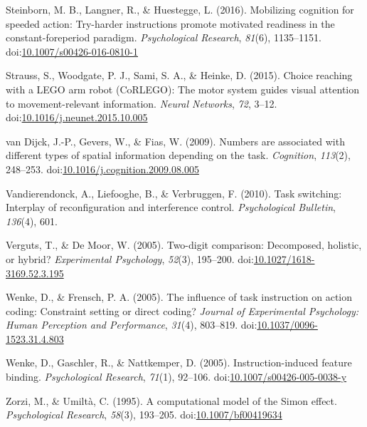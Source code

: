\documentclass[english,man]{apa6}
\theoremstyle{definition}
\theoremstyle{definition}
\theoremstyle{definition}
\theoremstyle{remark}
\begin{document}
\hypertarget{ref-steinborn2016}{}
Steinborn, M. B., Langner, R., \& Huestegge, L. (2016). Mobilizing
cognition for speeded action: Try-harder instructions promote motivated
readiness in the constant-foreperiod paradigm. \emph{Psychological
Research}, \emph{81}(6), 1135--1151.
doi:\href{https://doi.org/10.1007/s00426-016-0810-1}{10.1007/s00426-016-0810-1}

\hypertarget{ref-strauss2015}{}
Strauss, S., Woodgate, P. J., Sami, S. A., \& Heinke, D. (2015). Choice
reaching with a LEGO arm robot (CoRLEGO): The motor system guides visual
attention to movement-relevant information. \emph{Neural Networks},
\emph{72}, 3--12.
doi:\href{https://doi.org/10.1016/j.neunet.2015.10.005}{10.1016/j.neunet.2015.10.005}

\hypertarget{ref-vanDijck2009}{}
van Dijck, J.-P., Gevers, W., \& Fias, W. (2009). Numbers are associated
with different types of spatial information depending on the task.
\emph{Cognition}, \emph{113}(2), 248--253.
doi:\href{https://doi.org/10.1016/j.cognition.2009.08.005}{10.1016/j.cognition.2009.08.005}

\hypertarget{ref-vandierendonck2010}{}
Vandierendonck, A., Liefooghe, B., \& Verbruggen, F. (2010). Task
switching: Interplay of reconfiguration and interference control.
\emph{Psychological Bulletin}, \emph{136}(4), 601.

\hypertarget{ref-verguts2005}{}
Verguts, T., \& De Moor, W. (2005). Two-digit comparison: Decomposed,
holistic, or hybrid? \emph{Experimental Psychology}, \emph{52}(3),
195--200.
doi:\href{https://doi.org/10.1027/1618-3169.52.3.195}{10.1027/1618-3169.52.3.195}

\hypertarget{ref-wenke2005}{}
Wenke, D., \& Frensch, P. A. (2005). The influence of task instruction
on action coding: Constraint setting or direct coding? \emph{Journal of
Experimental Psychology: Human Perception and Performance},
\emph{31}(4), 803--819.
doi:\href{https://doi.org/10.1037/0096-1523.31.4.803}{10.1037/0096-1523.31.4.803}

\hypertarget{ref-wenkeGaschler2005}{}
Wenke, D., Gaschler, R., \& Nattkemper, D. (2005). Instruction-induced
feature binding. \emph{Psychological Research}, \emph{71}(1), 92--106.
doi:\href{https://doi.org/10.1007/s00426-005-0038-y}{10.1007/s00426-005-0038-y}

\hypertarget{ref-zorzi1995}{}
Zorzi, M., \& Umiltà, C. (1995). A computational model of the Simon
effect. \emph{Psychological Research}, \emph{58}(3), 193--205.
doi:\href{https://doi.org/10.1007/bf00419634}{10.1007/bf00419634}
\end{document}
